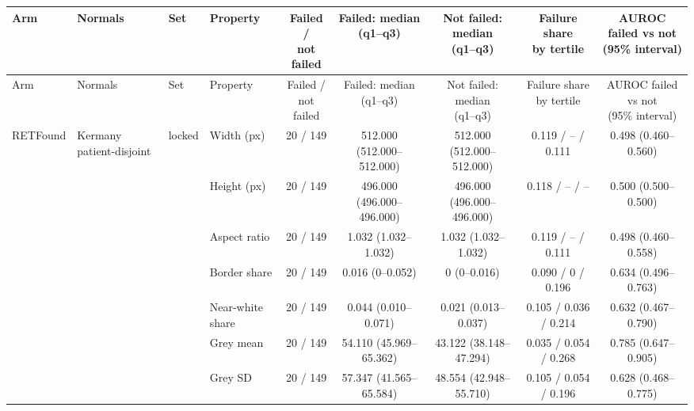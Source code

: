 \begin{longtable}{@{}llllccccc@{}}
\toprule
Arm & Normals & Set & Property & \makecell{Failed /\\not failed} & \makecell{Failed: median\\(q1--q3)} & \makecell{Not failed: median\\(q1--q3)} & \makecell{Failure share\\by tertile} & \makecell{AUROC failed vs not\\(95\% interval)} \\
\midrule
\endfirsthead
\toprule
Arm & Normals & Set & Property & \makecell{Failed /\\not failed} & \makecell{Failed: median\\(q1--q3)} & \makecell{Not failed: median\\(q1--q3)} & \makecell{Failure share\\by tertile} & \makecell{AUROC failed vs not\\(95\% interval)} \\
\midrule
\endhead
\bottomrule
\endfoot
\bottomrule
\endlastfoot
RETFound & Kermany patient-disjoint & locked & Width (px) & 20 / 149 & 512.000 (512.000--512.000) & 512.000 (512.000--512.000) & 0.119 / -- / 0.111 & 0.498 (0.460--0.560) \\
 &  &  & Height (px) & 20 / 149 & 496.000 (496.000--496.000) & 496.000 (496.000--496.000) & 0.118 / -- / -- & 0.500 (0.500--0.500) \\
 &  &  & Aspect ratio & 20 / 149 & 1.032 (1.032--1.032) & 1.032 (1.032--1.032) & 0.119 / -- / 0.111 & 0.498 (0.460--0.558) \\
 &  &  & Border share & 20 / 149 & 0.016 (0--0.052) & 0 (0--0.016) & 0.090 / 0 / 0.196 & 0.634 (0.496--0.763) \\
 &  &  & Near-white share & 20 / 149 & 0.044 (0.010--0.071) & 0.021 (0.013--0.037) & 0.105 / 0.036 / 0.214 & 0.632 (0.467--0.790) \\
 &  &  & Grey mean & 20 / 149 & 54.110 (45.969--65.362) & 43.122 (38.148--47.294) & 0.035 / 0.054 / 0.268 & 0.785 (0.647--0.905) \\
 &  &  & Grey SD & 20 / 149 & 57.347 (41.565--65.584) & 48.554 (42.948--55.710) & 0.105 / 0.054 / 0.196 & 0.628 (0.468--0.775) \\

\end{longtable}
